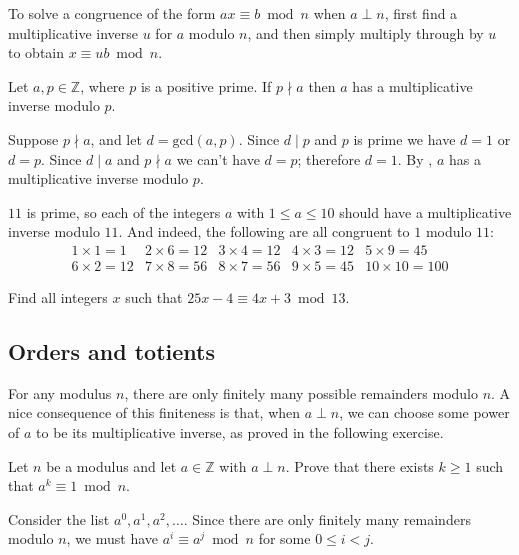 \begin{prooftip}
To solve a congruence of the form $ax \equiv b \bmod n$ when $a \perp n$, first find a multiplicative inverse $u$ for $a$ modulo $n$, and then simply multiply through by $u$ to obtain $x \equiv ub \bmod n$.
\end{prooftip}

\begin{corollary}
Let $a,p \in \mathbb{Z}$, where $p$ is a positive prime. If $p \nmid a$ then $a$ has a multiplicative inverse modulo $p$.
\end{corollary}
\begin{cproof}
Suppose $p \nmid a$, and let $d = \mathrm{gcd}(a,p)$. Since $d \mid p$ and $p$ is prime we have $d=1$ or $d=p$. Since $d \mid a$ and $p \nmid a$ we can't have $d=p$; therefore $d=1$. By , $a$ has a multiplicative inverse modulo $p$.
\end{cproof}

\begin{example}
$11$ is prime, so each of the integers $a$ with $1 \le a \le 10$ should have a multiplicative inverse modulo $11$. And indeed, the following are all congruent to $1$ modulo $11$:
\[ \begin{matrix}
1 \times 1 = 1 & 2 \times 6 = 12 & 3 \times 4 = 12 & 4 \times 3 = 12 & 5 \times 9 = 45 \\ 6 \times 2 = 12 & 7 \times 8 = 56 & 8 \times 7 = 56 & 9 \times 5 = 45 & 10 \times 10 = 100
\end{matrix} \]
\end{example}

\begin{exercise}
Find all integers $x$ such that $25x-4 \equiv 4x+3 \bmod 13$.
\end{exercise}

\subsection*{Orders and totients}

For any modulus $n$, there are only finitely many possible remainders modulo $n$. A nice consequence of this finiteness is that, when $a \perp n$, we can choose some power of $a$ to be its multiplicative inverse, as proved in the following exercise.

\begin{exercise}
\label{exPowerModN}
Let $n$ be a modulus and let $a \in \mathbb{Z}$ with $a \perp n$. Prove that there exists $k \ge 1$ such that $a^k \equiv 1 \bmod n$.
\begin{backhint}
Consider the list $a^0, a^1, a^2, \dots$. Since there are only finitely many remainders modulo $n$, we must have $a^i \equiv a^j \bmod n$ for some $0 \le i < j$.
\end{backhint}
\end{exercise}

